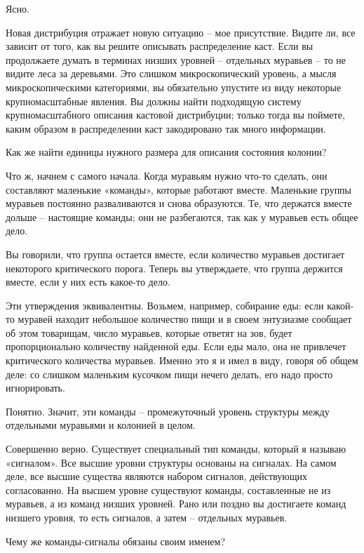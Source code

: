 \documentclass[../main.tex]{subfiles}
\begin{document}
\begin{dialogue}
 Ясно.

 Новая дистрибуция отражает новую ситуацию \--- мое присутствие. Видите ли, все зависит от того, как вы решите описывать распределение каст. Если вы продолжаете думать в терминах низших уровней \--- отдельных муравьев \--- то не видите леса за деревьями. Это слишком микроскопический уровень, а мысля микроскопическими категориями, вы обязательно упустите из виду некоторые крупномасштабные явления. Вы должны найти подходящую систему крупномасштабного описания кастовой дистрибуции; только тогда вы поймете, каким образом в распределении каст закодировано так много информации.

 Как же найти единицы нужного размера для описания состояния колонии?

 Что ж, начнем с самого начала. Когда муравьям нужно что-то сделать, они составляют маленькие «команды», которые работают вместе. Маленькие группы муравьев постоянно разваливаются и снова образуются. Те, что держатся вместе дольше \--- настоящие команды; они не разбегаются, так как у муравьев есть общее дело.

 Вы говорили, что группа остается вместе, если количество муравьев достигает некоторого критического порога. Теперь вы утверждаете, что группа держится вместе, если у них есть какое-то дело.

 Эти утверждения эквивалентны. Возьмем, например, собирание еды: если какой-то муравей находит небольшое количество пищи и в своем энтузиазме сообщает об этом товарищам, число муравьев, которые ответят на зов, будет пропорционально количеству найденной еды. Если еды мало, она не привлечет критического количества муравьев. Именно это я и имел в виду, говоря об общем деле: со слишком маленьким кусочком пищи нечего делать, его надо просто игнорировать.

 Понятно. Значит, эти команды \--- промежуточный уровень структуры между отдельными муравьями и колонией в целом.

 Совершенно верно. Существует специальный тип команды, который я называю «сигналом». Все высшие уровни структуры основаны на сигналах. На самом деле, все высшие существа являются набором сигналов, действующих согласованно. На высшем уровне существуют команды, составленные не из муравьев, а из команд низших уровней. Рано или поздно вы достигаете команд низшего уровня, то есть сигналов, а затем \--- отдельных муравьев.

 Чему же команды-сигналы обязаны своим именем?


\end{dialogue}
\end{document}

